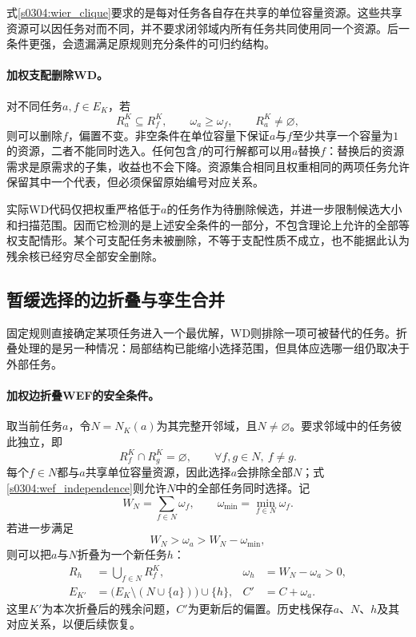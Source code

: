 式\eqref{s0304:wier_clique}要求的是每对任务各自存在共享的单位容量资源。这些共享资源可以因任务对而不同，并不要求闭邻域内所有任务共同使用同一个资源。后一条件更强，会遗漏满足原规则充分条件的可归约结构。

\paragraph{加权支配删除WD。}
对不同任务$a,f\in E_K$，若
\begin{equation}
 R_a^K\subseteq R_f^K,
 \qquad \omega_a\geq\omega_f,
 \qquad R_a^K\ne\varnothing,
 \label{s0304:wd_condition}
\end{equation}
则可以删除$f$，偏置不变。非空条件在单位容量下保证$a$与$f$至少共享一个容量为$1$的资源，二者不能同时选入。任何包含$f$的可行解都可以用$a$替换$f$：替换后的资源需求是原需求的子集，收益也不会下降。资源集合相同且权重相同的两项任务允许保留其中一个代表，但必须保留原始编号对应关系。

实际WD代码仅把权重严格低于$a$的任务作为待删除候选，并进一步限制候选大小和扫描范围。因而它检测的是上述安全条件的一部分，不包含理论上允许的全部等权支配情形。某个可支配任务未被删除，不等于支配性质不成立，也不能据此认为残余核已经穷尽全部安全删除。

\subsection{暂缓选择的边折叠与孪生合并}

固定规则直接确定某项任务进入一个最优解，WD则排除一项可被替代的任务。折叠处理的是另一种情况：局部结构已能缩小选择范围，但具体应选哪一组仍取决于外部任务。

\paragraph{加权边折叠WEF的安全条件。}
取当前任务$a$，令$N=N_K(a)$为其完整开邻域，且$N\ne\varnothing$。要求邻域中的任务彼此独立，即
\begin{equation}
 R_f^K\cap R_g^K=\varnothing,
 \qquad \forall f,g\in N,\ f\ne g.
 \label{s0304:wef_independence}
\end{equation}
每个$f\in N$都与$a$共享单位容量资源，因此选择$a$会排除全部$N$；式\eqref{s0304:wef_independence}则允许$N$中的全部任务同时选择。记
\begin{equation}
 W_N=\sum_{f\in N}\omega_f,
 \qquad \omega_{\min}=\min_{f\in N}\omega_f.
 \label{s0304:wef_neighbor_weight}
\end{equation}
若进一步满足
\begin{equation}
 W_N>\omega_a>W_N-\omega_{\min},
 \label{s0304:wef_weight}
\end{equation}
则可以把$a$与$N$折叠为一个新任务$h$：
\begin{align}
 R_h&=\bigcup_{f\in N}R_f^K,
 &\omega_h&=W_N-\omega_a>0,
 \label{s0304:wef_new_edge}\\
 E_{K'}&=\bigl(E_K\setminus(N\cup\{a\})\bigr)\cup\{h\},
 &C'&=C+\omega_a.
 \label{s0304:wef_update}
\end{align}
这里$K'$为本次折叠后的残余问题，$C'$为更新后的偏置。历史栈保存$a$、$N$、$h$及其对应关系，以便后续恢复。

